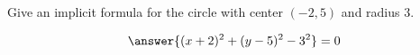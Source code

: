 \documentclass{ximera}
\author{Bart Snapp}
\begin{document}
\begin{exercise}
  Give an implicit formula for the circle with center $(-2,5)$ and radius $3$.
  \begin{prompt}
  \[
  \answer{(x+2)^2 + (y-5)^2-3^2}=0
  \]
  \end{prompt}
\end{exercise}
\end{document}
